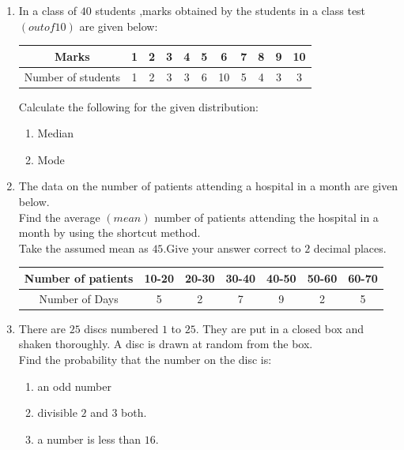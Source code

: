 \documentclass[12pt,-letter paper]{article}
\providecommand{\brak}[1]{\ensuremath{\left(#1\right)}}
\begin{document}
\begin{enumerate}
\begin{center}
    \section*{Statistics and Probability}
\end{center}
\item In a class of $40$ students ,marks obtained by the students in a class test \brak{out   of  10 } are given below:

       \begin{tabular}{|c|c|c|c|c|c|c|c|c|c|c|}
\hline
	       Marks& 1 & 2 & 3 & 4 & 5 & 6 & 7 & 8 & 9 & 10\\
\hline
	       Number of students & 1 & 2 & 3 & 3 & 6 & 10 & 5 & 4 & 3 & 3\\
\hline
       \end{tabular}

\text Calculate the following for the given distribution:
		\begin{enumerate}
        \item Median
		\item Mode
		\end{enumerate}


\item The data on the number of patients attending a hospital in a month are given below.\\
Find the average \brak{mean} number of patients attending the hospital in a month by using the shortcut method.\\
Take the assumed mean as $45$.Give your answer correct to $2$ decimal places.
\begin{tabular}{|c|c|c|c|c|c|c|}
\hline
	       Number of patients& 10-20 & 20-30 & 30-40 & 40-50 & 50-60 & 60-70\\
\hline
	       Number of Days & 5 & 2 & 7 & 9 & 2 & 5\\
\hline
       \end{tabular}

\item There are $25$ discs numbered $1$ to $25$. They are put in a closed box and shaken thoroughly. A disc is drawn at random from the box.\\
Find the probability that the number on the disc is:
\begin{enumerate}
    \item an odd number
    \item divisible $2$ and $3$ both.
    \item a number is less than $16$.
\end{enumerate}


\end{enumerate}
\end{document}
